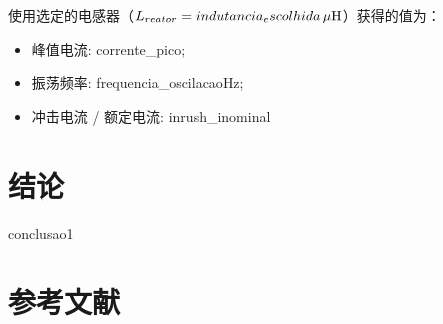 \documentclass[a4paper]{article}
\begin{document}
	使用选定的电感器（$L_{reator} = {{indutancia_escolhida}} \, \mu \rm{H} $）获得的值为：
	\begin{itemize}[label=\textendash]
		\item 峰值电流: {{corrente_pico}};
		\item 振荡频率: {{frequencia_oscilacao}}Hz;
		\item 冲击电流 / 额定电流: {{inrush_inominal}}
	\end{itemize}
	
	\section{结论}
	{{conclusao1}}
	
	\section{参考文献}
	
\end{document}
